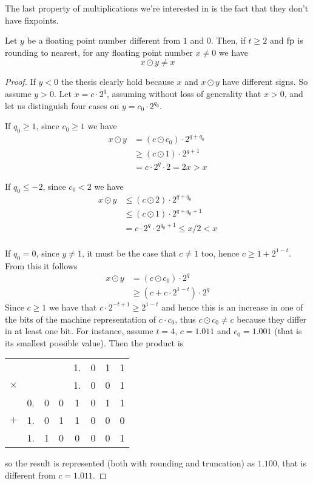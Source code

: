 The last property of multiplications we're interested in is the fact that they don't have fixpoints.
\begin{prop}
	Let $y$ be a floating point number different from $1$ and $0$. Then, if $t \ge 2$ and $\text{fp}$ is rounding to nearest, for any floating point number $x \neq 0$ we have
	\[
	x \odot y \neq x
	\]
\end{prop}
\begin{proof}
	If $y < 0$ the thesis clearly hold because $x$ and $x \odot y$ have different signs. So assume $y > 0$.
	Let $x = c \cdot 2^q$, assuming without loss of generality that $x > 0$, and let us distinguish four cases on $y = c_0 \cdot 2^{q_0}$.

	If $q_0 \ge 1$, since $c_0 \ge 1$ we have
	\begin{align*}
		x \odot y &= (c \odot c_0) \cdot 2^{q + q_0} \\
		&\ge (c \odot 1) \cdot 2^{q + 1} \\
		&= c \cdot 2^{q} \cdot 2 = 2 x > x
	\end{align*}

	If $q_0 \le -2$, since $c_0 < 2$ we have
	\begin{align*}
		x \odot y &\le (c \odot 2) \cdot 2^{q + q_0} \\
		&\le (c \odot 1) \cdot 2^{q + q_0 + 1} \\
		&= c \cdot 2^{q} \cdot 2^{q_0 + 1} \le x / 2 < x\\
	\end{align*}

	If $q_0 = 0$, since $y \neq 1$, it must be the case that $c \neq 1$ too, hence $c \ge 1 + 2^{1-t}$. From this it follows
	\begin{align*}
		x \odot y &= (c \odot c_0) \cdot 2^q \\
		&\ge (c + c \cdot 2^{1-t}) \cdot 2^q
	\end{align*}
	Since $c \ge 1$ we have that $c \cdot 2^{-t+1} \ge 2^{1-t}$ and hence this is an increase in one of the bits of the machine representation of $c \cdot c_0$, thus $c \odot c_0 \neq c$ because they differ in at least one bit.
	For instance, assume $t = 4$, $c = 1.011$ and $c_0 = 1.001$ (that is its smallest possible value). Then the product is
	\begin{center}
		\begin{tabular}{c@{\;}c@{\,}c@{\,}c@{\,}c@{\,}c@{\,}c@{\,}c}
			& & & & 1. & 0 & 1 & 1 \\
			$\times$ & & & & 1. & 0 & 0 & 1 \\
			\hline
			& 0. & 0 & 0 & 1 & 0 & 1 & 1 \\
			$+$ & 1. & 0 & 1 & 1 & 0 & 0 & 0 \\
			\hline
			& 1. & 1 & 0 & 0 & 0 & 0 & 1
		\end{tabular}
	\end{center}
	so the result is represented (both with rounding and truncation) as $1.100$, that is different from $c = 1.011$.


\end{proof}
